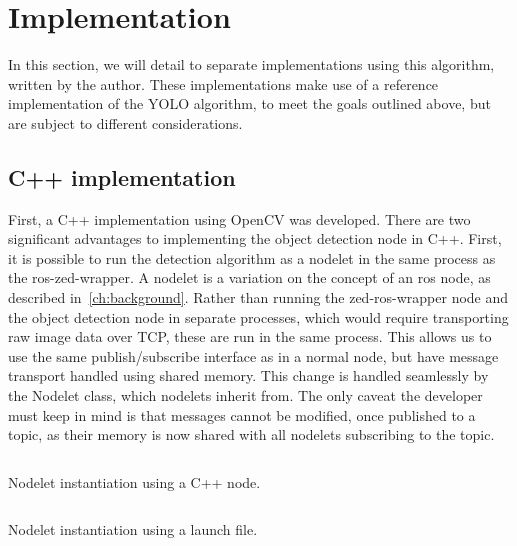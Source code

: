 \documentclass[\rootfolder/main.tex]{subfiles}
\begin{document}

\section{Implementation}

In this section, we will detail to separate implementations using this algorithm, written by the author.
These implementations make use of a reference implementation of the YOLO algorithm, to meet the goals outlined above, but are subject to different considerations.


\subsection{C++ implementation}

First, a C++ implementation using OpenCV was developed.
There are two significant advantages to implementing the object detection node in C++.
First, it is possible to run the detection algorithm as a nodelet in the same process as the ros-zed-wrapper.
A nodelet is a variation on the concept of an \acrshort{ros} node, as described in~\cref{ch:background}.
Rather than running the zed-ros-wrapper node and the object detection node in separate processes, which would require transporting raw image data over TCP, these are run in the same process.
This allows us to use the same publish/subscribe interface as in a normal node, but have message transport handled using shared memory.
This change is handled seamlessly by the Nodelet class, which nodelets inherit from.
The only caveat the developer must keep in mind is that messages cannot be modified, once published to a topic, as their memory is now shared with all nodelets subscribing to the topic.

\begin{listing}
    \inputminted{cpp}{\rootfolder/Chapters/Chapter5/Listings/object_detector_node.cpp}
    \caption{Nodelet instantiation using a C++ node.}
    \label{lst:detection-node-cpp}
\end{listing}

\begin{listing}
    \inputminted{xml}{\rootfolder/Chapters/Chapter5/Listings/ros_dnn.launch}
    \caption{Nodelet instantiation using a launch file.}
    \label{lst:detection-node-launch}
\end{listing}
\end{document}
